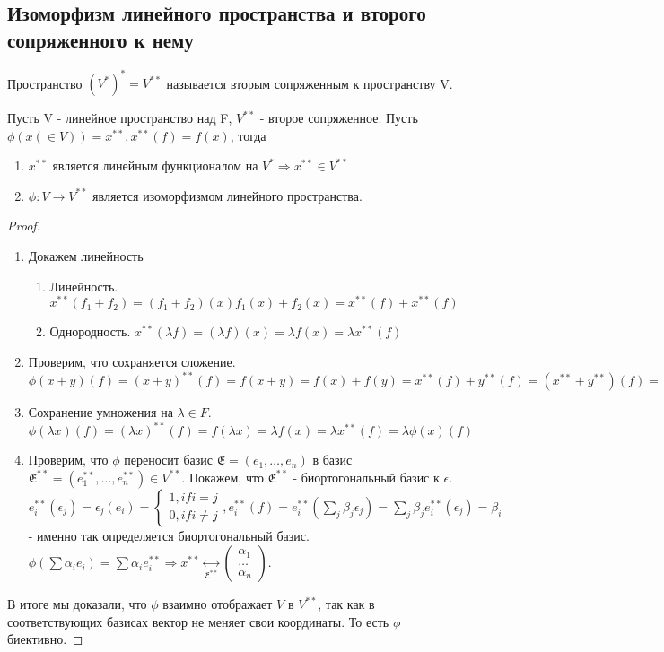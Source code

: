 \subsection{Изоморфизм линейного пространства и второго сопряженного к нему}
\begin{definition}
	Пространство \((V^{*})^{*} = V^{**}\) называется вторым сопряженным к пространству V.
\end{definition}
\begin{theorem}
	Пусть V - линейное пространство над F, \(V^{**}\) - второе сопряженное. Пусть \(\phi(x(\in V))=x^{**}, x^{**}(f) = f(x)\), тогда 
	\begin{enumerate}
		\item \(x^{**}\) является линейным функционалом на \(V^{*}\Longrightarrow x^{**}\in V^{**}\)
		\item \(\phi:V\to V^{**}\) является изоморфизмом линейного пространства.
	\end{enumerate}
\end{theorem}
\begin{proof}
	\begin{enumerate}
		\item Докажем линейность \begin{enumerate}
			\item Линейность. \(x^{**}(f_1+f_2) = (f_1+f_2)(x)  f_1(x) + f_2(x) = x^{**}(f) + x^{**}(f)\)
			\item Однородность. \(x^{**}(\lambda f) = (\lambda f)(x) = \lambda f(x) = \lambda x^{**}(f)\)
			
			\end{enumerate}
		\item Проверим, что сохраняется сложение. \(\phi(x+y)(f) = (x+y)^{**}(f) = f(x+y) = f(x)+f(y) = x^{**}(f) + y^{**}(f) = (x^{**}+y^{**})(f) = (\phi(x) + \phi(y))(f)\)
		\item Сохранение умножения на \(\lambda\in F\). \(\phi(\lambda x)(f) = (\lambda x)^{**}(f) = f(\lambda x) = \lambda f(x) = \lambda x^{**}(f) = \lambda \phi(x)(f)\)
		\item Проверим, что \(\phi\) переносит базис \(\mathfrak{E} = (e_1, \ldots, e_n)\) в базис \(\mathfrak{E}^{**} = (e_1^{**}, \ldots, e_n^{**})\in V^{**}\). Покажем, что \(\mathfrak{E}^{**}\) - биортогональный базис к \(\mathfrak{\epsilon}\). \(e_i^{**}(\epsilon_j) = \epsilon_j(e_i) = \left\{\begin{gathered}
			1, if i = j \\ 
			0, if i\ne j
		\end{gathered}\right., e_i^{**}(f) = e_i^{**}(\sum_j \beta_j\epsilon_j) = \sum_j \beta_j e_i^{**}(\epsilon_j) = \beta_i\) - именно так определяется биортогональный базис. \(\phi(\sum \alpha_ie_i) = \sum \alpha_i e_i^{**} \Longrightarrow x^{**}\underset{\mathfrak{E}^{**}}{\longleftrightarrow}\begin{pmatrix}
		\alpha_1 \\ \ldots \\ \alpha_n
		\end{pmatrix}\). 
	\end{enumerate}
	В итоге мы доказали, что \(\phi\) взаимно отображает \(V\) в \(V^{**}\), так как в соответствующих базисах вектор не меняет свои координаты. То есть \(\phi\) биективно.
\end{proof}
